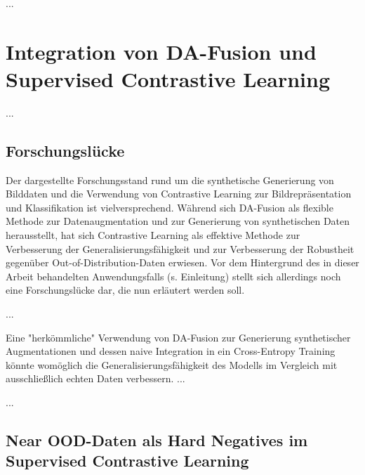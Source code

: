 ...

\section{Integration von DA-Fusion und Supervised Contrastive Learning}

...

\subsection{Forschungslücke}

Der dargestellte Forschungsstand rund um die synthetische Generierung von Bilddaten und die Verwendung von Contrastive Learning zur Bildrepräsentation und Klassifikation ist vielversprechend. Während sich DA-Fusion als flexible Methode zur Datenaugmentation und zur Generierung von synthetischen Daten herausstellt, hat sich Contrastive Learning als effektive Methode zur Verbesserung der Generalisierungsfähigkeit und zur Verbesserung der Robustheit gegenüber Out-of-Distribution-Daten erwiesen. Vor dem Hintergrund des in dieser Arbeit behandelten Anwendungsfalls (s. Einleitung) stellt sich allerdings noch eine Forschungslücke dar, die nun erläutert werden soll.

...

Eine "herkömmliche" Verwendung von DA-Fusion zur Generierung synthetischer Augmentationen und dessen naive Integration in ein Cross-Entropy Training könnte womöglich die Generalisierungsfähigkeit des Modells im Vergleich mit ausschließlich echten Daten verbessern. ...

...

\subsection{Near OOD-Daten als Hard Negatives im Supervised Contrastive Learning}

